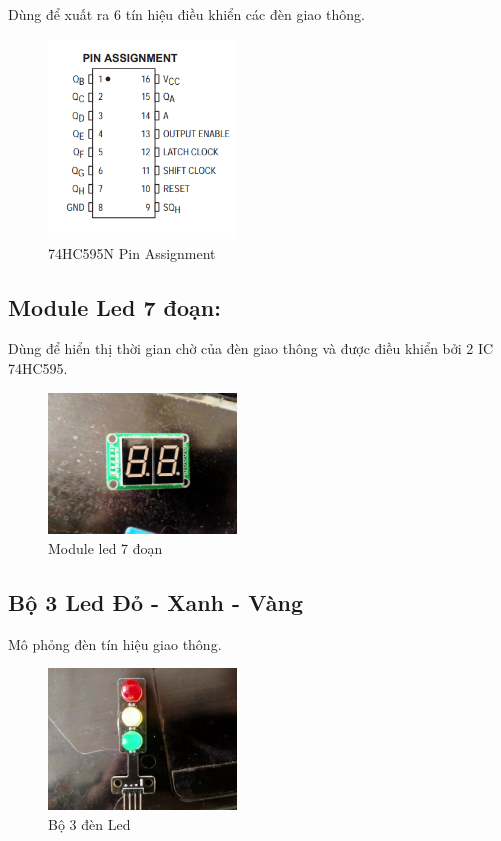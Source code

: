 \documentclass[a4paper]{article}
\begin{document}
Dùng để xuất ra 6 tín hiệu điều khiển các đèn giao thông.
\begin{figure}[H]
\begin{center}
\includegraphics[width=5cm]{pic10.png}
\caption{74HC595N Pin Assignment}
\end{center}
\end{figure}

\subsection{Module Led 7 đoạn:}

Dùng để hiển thị thời gian chờ của đèn giao thông và được điều khiển bởi 2 IC 74HC595.
\begin{figure}[H]
\begin{center}
\includegraphics[width=5cm]{pic4.jpg}
\caption{Module led 7 đoạn}
\end{center}
\end{figure}

\subsection{Bộ 3 Led Đỏ - Xanh - Vàng}

Mô phỏng đèn tín hiệu giao thông.
 \begin{figure}[H]
\begin{center}
\includegraphics[width=5cm]{pic5.jpg}
\caption{Bộ 3 đèn Led}
\end{center}
\end{figure}
\end{document}
